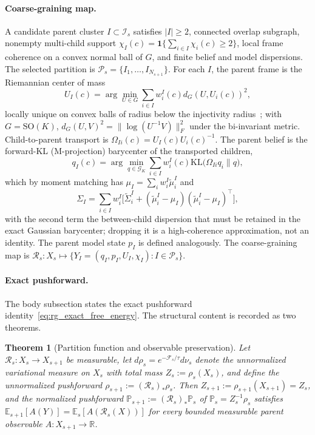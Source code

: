 \documentclass[11pt]{article}
\newtheorem{theorem}{Theorem}
\begin{document}
\paragraph{Coarse-graining map.}
A candidate parent cluster $I \subset \mathcal{I}_s$ satisfies $|I| \ge 2$, connected overlap subgraph, nonempty multi-child support $\chi_I(c) = \mathbf{1}\{\sum_{i \in I}\chi_i(c) \ge 2\}$, local frame coherence on a convex normal ball of $G$, and finite belief and model dispersions. The selected partition is $\mathcal{P}_s = \{I_1, \ldots, I_{N_{s+1}}\}$. For each $I$, the parent frame is the Riemannian center of mass
\begin{equation}
U_I(c) = \arg\min_{U \in G} \sum_{i \in I} w_i^I(c) d_G(U, U_i(c))^2,
\end{equation}
locally unique on convex balls of radius below the injectivity radius~\cite{karcher1977riemannian}; with $G = \mathrm{SO}(K)$, $d_G(U, V)^2 = \|\log(U^{-1}V)\|_F^2$ under the bi-invariant metric. Child-to-parent transport is $\Omega_{Ii}(c) = U_I(c)U_i(c)^{-1}$. The parent belief is the forward-KL (M-projection) barycenter of the transported children,
\begin{equation}
q_I(c) = \arg\min_{q \in \mathcal{G}_K} \sum_{i \in I} w_i^I(c) \mathrm{KL}\big(\Omega_{Ii}q_i \| q\big),
\end{equation}
which by moment matching has $\mu_I = \sum_i w_i^I \widetilde{\mu}_i^I$ and
\begin{equation}
\Sigma_I = \sum_{i \in I} w_i^I\big[\widetilde{\Sigma}_i^I + (\widetilde{\mu}_i^I - \mu_I)(\widetilde{\mu}_i^I - \mu_I)^\top\big],
\end{equation}
with the second term the between-child dispersion that must be retained in the exact Gaussian barycenter; dropping it is a high-coherence approximation, not an identity. The parent model state $p_I$ is defined analogously. The coarse-graining map is $\mathcal{R}_s : X_s \mapsto \{Y_I = (q_I, p_I, U_I, \chi_I) : I \in \mathcal{P}_s\}$.

\paragraph{Exact pushforward.}
The body subsection states the exact pushforward identity~\eqref{eq:rg_exact_free_energy}. The structural content is recorded as two theorems.

\begin{theorem}[Partition function and observable preservation]
\label{thm:rg_pushforward}
Let $\mathcal{R}_s : X_s \to X_{s+1}$ be measurable, let $d\rho_s = e^{-\mathcal{F}_s/\tau} d\nu_s$ denote the unnormalized variational measure on $X_s$ with total mass $Z_s := \rho_s(X_s)$, and define the unnormalized pushforward $\rho_{s+1} := (\mathcal{R}_s)_*\rho_s$. Then $Z_{s+1} := \rho_{s+1}(X_{s+1}) = Z_s$, and the normalized pushforward $\mathbb{P}_{s+1} := (\mathcal{R}_s)_*\mathbb{P}_s$ of $\mathbb{P}_s = Z_s^{-1}\rho_s$ satisfies $\mathbb{E}_{s+1}[A(Y)] = \mathbb{E}_s[A(\mathcal{R}_s(X))]$ for every bounded measurable parent observable $A : X_{s+1} \to \mathbb{R}$.
\end{theorem}
\end{document}
